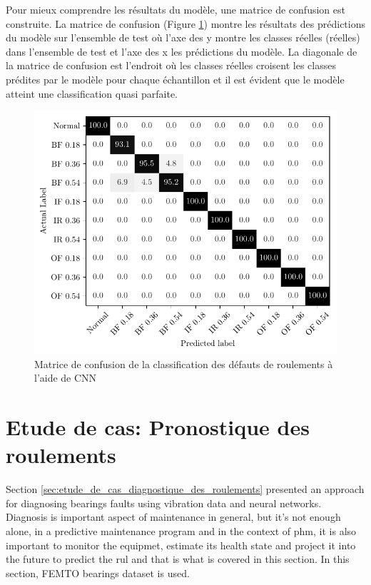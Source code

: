 Pour mieux comprendre les résultats du modèle, une matrice de confusion est construite. La matrice de confusion (Figure \ref{fig:bearings_faults_classification_confusion_matrix}) montre les résultats des prédictions du modèle sur l'ensemble de test où l'axe des y montre les classes réelles (réelles) dans l'ensemble de test et l'axe des x les prédictions du modèle. La diagonale de la matrice de confusion est l'endroit où les classes réelles croisent les classes prédites par le modèle pour chaque échantillon et il est évident que le modèle atteint une classification quasi parfaite.

\begin{figure}[H]
    \centering
    \includegraphics{figures/cw_bearings_faults_classification.pdf}
    \caption{Matrice de confusion de la classification des défauts de roulements à l'aide de CNN}
    \label{fig:bearings_faults_classification_confusion_matrix}
\end{figure}

\section{Etude de cas: Pronostique des roulements}%
\label{sec:etude_de_cas_pronostique_des_roulements}
Section \ref{sec:etude_de_cas_diagnostique_des_roulements} presented an approach for diagnosing bearings faults using vibration data and neural networks. Diagnosis is important aspect of maintenance in general, but it's not enough alone, in a predictive maintenance program and in the context of \acrshort{phm}, it is also important to monitor the equipmet, estimate its health state and project it into the future to predict the \acrshort{rul} and that is what is covered in this section. In this section, FEMTO bearings dataset is used.

